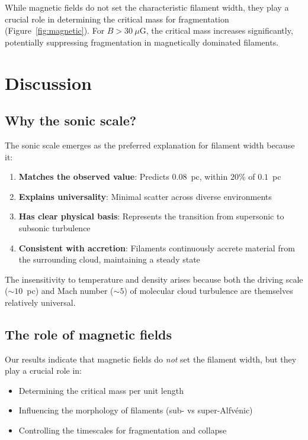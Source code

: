 \documentclass{mnras}
\begin{document}
While magnetic fields do not set the characteristic filament width, they play a crucial role in determining the critical mass for fragmentation (Figure~\ref{fig:magnetic}). For $B > 30~\mu$G, the critical mass increases significantly, potentially suppressing fragmentation in magnetically dominated filaments.


\section{Discussion}

\subsection{Why the sonic scale?}

The sonic scale emerges as the preferred explanation for filament width because it:

\begin{enumerate}
\item \textbf{Matches the observed value}: Predicts $0.08$~pc, within $20\%$ of $0.1$~pc
\item \textbf{Explains universality}: Minimal scatter across diverse environments
\item \textbf{Has clear physical basis}: Represents the transition from supersonic to subsonic turbulence
\item \textbf{Consistent with accretion}: Filaments continuously accrete material from the surrounding cloud, maintaining a steady state
\end{enumerate}

The insensitivity to temperature and density arises because both the driving scale ($\sim 10$~pc) and Mach number ($\sim 5$) of molecular cloud turbulence are themselves relatively universal.

\subsection{The role of magnetic fields}

Our results indicate that magnetic fields do \emph{not} set the filament width, but they play a crucial role in:
\begin{itemize}
\item Determining the critical mass per unit length
\item Influencing the morphology of filaments (sub- vs super-Alfv\'enic)
\item Controlling the timescales for fragmentation and collapse
\end{itemize}
\end{document}
